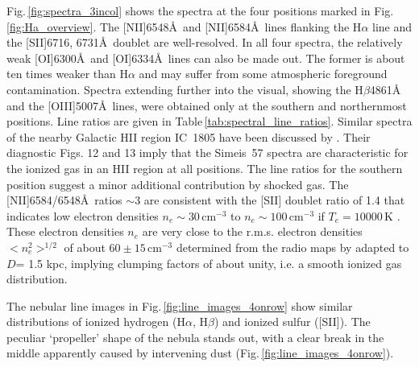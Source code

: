 \documentclass{aa}
\begin{document}
\par Fig.\,\ref{fig:spectra_3incol} shows the spectra at the four
positions marked in Fig.\,\ref{fig:Ha_overview}. The [NII]6548\AA\,
and [NII]6584\AA\, lines flanking the H$\alpha$ line and the
[SII]6716, 6731\AA\, doublet are well-resolved. In all four spectra,
the relatively weak [OI]6300\AA\, and [OI]6334\AA\, lines can also be
made out. The former is about ten times weaker than H$\alpha$ and may
suffer from some atmospheric foreground contamination. Spectra
extending further into the visual, showing the H$\beta$4861\AA\, and
the [OIII]5007\AA\, lines, were obtained only at the southern and
northernmost positions. Line ratios are given in
Table\,\ref{tab:spectral_line_ratios}.  Similar spectra of the nearby Galactic HII region IC~1805 have
been discussed by \cite{Lagrois2012}.  Their diagnostic Figs. 12 and
13 imply that the Simeis~57 spectra are characteristic for the ionized
gas in an HII region at all positions.  The line ratios for the
southern position suggest a minor additional contribution by shocked
gas. The [NII]6584/6548\AA\, ratios $\sim3$ are consistent with the
[SII] doublet ratio of 1.4 that indicates low electron densities
$n_e\sim 30\, \mathrm{cm^{-3}}$ to $n_e\sim 100\, \mathrm{cm^{-3}}$ if
$T_e=10000\, \mathrm{K}$ \citep{2006agna.book.....O}. These electron
densities $n_e$ are very close to the r.m.s. electron densities
$<n_e^2>^{1/2}$ of about $60\pm15\, \mathrm{cm^{-3}}$ determined from
the radio maps by \cite{israel2003} adapted to $D$= 1.5 kpc, implying
clumping factors of about unity, i.e. a smooth ionized gas
distribution.

\par The nebular line images in Fig.\,\ref{fig:line_images_4onrow}
show similar distributions of ionized hydrogen (H$\alpha$, H$\beta$)
and ionized sulfur ([SII]). The peculiar `propeller' shape
of the nebula stands out, with a clear break in the middle apparently
caused by intervening dust (Fig.\,\ref{fig:line_images_4onrow}).
\end{document}
